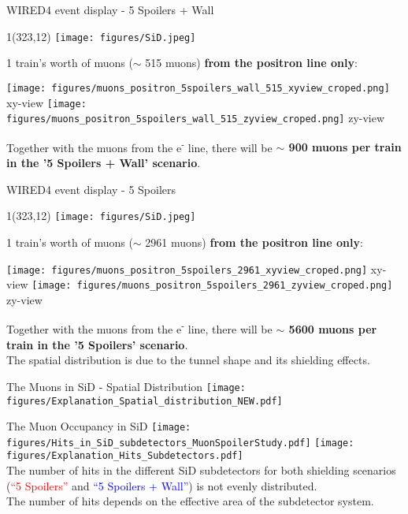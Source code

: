 \documentclass[xcolor={dvipsnames}]{beamer}
\newcommand{\sidlogo}{
  \setlength{\TPHorizModule}{1pt}
  \setlength{\TPVertModule}{1pt}
  \begin{textblock}{1}(323,12)
   \texttt{[image: figures/SiD.jpeg]}
  \end{textblock}
  }
\begin{document}
\begin{frame}{WIRED4 event display - 5 Spoilers + Wall}
\sidlogo
1 train's worth of muons ($\sim$ 515 muons) \textbf{from the positron line only}:
\begin{center}
\texttt{[image: figures/muons\_positron\_5spoilers\_wall\_515\_xyview\_croped.png]}
{\tiny xy-view}
\texttt{[image: figures/muons\_positron\_5spoilers\_wall\_515\_zyview\_croped.png]}
{\tiny zy-view}
\end{center}
Together with the muons from the e\textsuperscript{-} line, there will be \textbf{$\sim$ 900 muons per train in the '5 Spoilers + Wall' scenario}.
\end{frame}
\begin{frame}{WIRED4 event display - 5 Spoilers}
\sidlogo
1 train's worth of muons ($\sim$ 2961 muons) \textbf{from the positron line only}:
\begin{center}
\texttt{[image: figures/muons\_positron\_5spoilers\_2961\_xyview\_croped.png]}
{\tiny xy-view}
\texttt{[image: figures/muons\_positron\_5spoilers\_2961\_zyview\_croped.png]}
{\tiny zy-view}
\end{center}
Together with the muons from the e\textsuperscript{-} line, there will be \textbf{$\sim$ 5600 muons per train in the '5 Spoilers' scenario}.\\
The spatial distribution is due to the tunnel shape and its shielding effects.
\end{frame}

\begin{frame}{The Muons in SiD - Spatial Distribution}
 \texttt{[image: figures/Explanation\_Spatial\_distribution\_NEW.pdf]}
\end{frame}

\begin{frame}{The Muon Occupancy in SiD}
 \texttt{[image: figures/Hits\_in\_SiD\_subdetectors\_MuonSpoilerStudy.pdf]}
  \texttt{[image: figures/Explanation\_Hits\_Subdetectors.pdf]}\\
The number of hits in the different SiD subdetectors for both shielding scenarios (\textcolor{Red}{``5 Spoilers''} and \textcolor{Blue}{``5 Spoilers + Wall''}) is not evenly distributed.\\
The number of hits depends on the effective area of the subdetector system.
 \end{frame}
 
\end{document}
